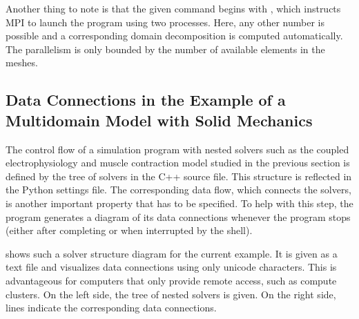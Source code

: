 Another thing to note is that the given command begins with , which instructs MPI to launch the program using two processes. Here, any other number is possible and a corresponding domain decomposition is computed automatically. The parallelism is only bounded by the number of available elements in the meshes.

\subsection{Data Connections in the Example of a Multidomain Model with Solid Mechanics}\label{sec:exemplary_usage_2b}

The control flow of a simulation program with nested solvers such as the coupled electrophysiology and muscle contraction model studied in the previous section is defined by the tree of solvers in the C++ source file. This structure is reflected in the Python settings file.
The corresponding data flow, which connects the solvers, is another important property that has to be specified.
To help with this step, the program generates a diagram of its data connections whenever the program stops (either after completing or when interrupted by the shell).

 shows such a solver structure diagram for the current example. It is given as a text file and visualizes data connections using only unicode characters. This is advantageous for computers that only provide remote access, such as compute clusters. 
On the left side, the tree of nested solvers is given. On the right side, lines indicate the corresponding data connections.

